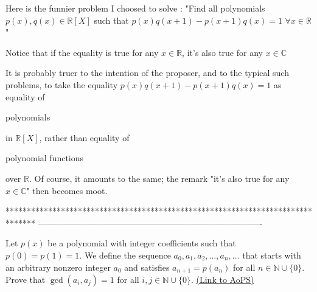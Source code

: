 \begin{solution}
	\begin{tcolorbox}Here is the funnier problem I choosed to solve :
"Find all polynomials $p(x),q(x)\in\mathbb R[X]$ such that $p(x)q(x+1)-p(x+1)q(x)=1$ $\forall x\in\mathbb R$"

Notice that if the equality is true for any $x\in\mathbb R$, it's also true for any $x\in\mathbb C$\end{tcolorbox}
It is probably truer to the intention of the proposer, and to the typical such problems, to take the equality $p(x)q(x+1)-p(x+1)q(x)=1$ as equality of \begin{bolded}polynomials\end{bolded} in $\mathbb R[X]$, rather than equality of\begin{bolded} polynomial functions \end{bolded}over $\mathbb R$. Of course, it amounts to the same; the remark "it's also true for any $x\in\mathbb C$" then becomes moot.
\end{solution}
*******************************************************************************
-------------------------------------------------------------------------------

\begin{problem}
	Let $p(x)$ be a polynomial with integer coefficients such that $p(0)=p(1)=1$. We define the sequence $a_0, a_1, a_2, \ldots, a_n, \ldots$ that starts with an arbitrary nonzero integer $a_0$ and satisfies $a_{n+1}=p(a_n)$ for all $n \in \mathbb N\cup \{0\}$. Prove that $\gcd(a_i,a_j)=1$ for all $i,j \in \mathbb N \cup \{0\}$.
	\flushright \href{https://artofproblemsolving.com/community/c6h410938}{(Link to AoPS)}
\end{problem}



